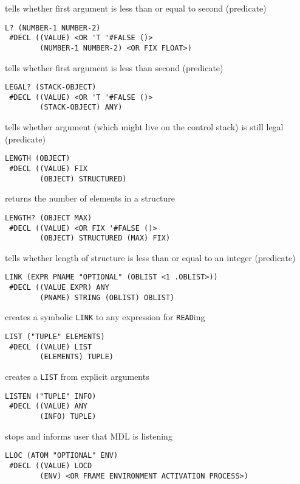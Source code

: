 \documentclass[a4paper,]{article}
\begin{document}
tells whether first argument is less than or equal to second (predicate)

\begin{verbatim}
L? (NUMBER-1 NUMBER-2)
 #DECL ((VALUE) <OR 'T '#FALSE ()>
        (NUMBER-1 NUMBER-2) <OR FIX FLOAT>)
\end{verbatim}

tells whether first argument is less than second (predicate)

\begin{verbatim}
LEGAL? (STACK-OBJECT)
 #DECL ((VALUE) <OR 'T '#FALSE ()>
        (STACK-OBJECT) ANY)
\end{verbatim}

tells whether argument (which might live on the control stack) is still legal (predicate)

\begin{verbatim}
LENGTH (OBJECT)
 #DECL ((VALUE) FIX
        (OBJECT) STRUCTURED)
\end{verbatim}

returns the number of elements in a structure

\begin{verbatim}
LENGTH? (OBJECT MAX)
 #DECL ((VALUE) <OR FIX '#FALSE ()>
        (OBJECT) STRUCTURED (MAX) FIX)
\end{verbatim}

tells whether length of structure is less than or equal to an integer (predicate)

\begin{verbatim}
LINK (EXPR PNAME "OPTIONAL" (OBLIST <1 .OBLIST>))
 #DECL ((VALUE EXPR) ANY
        (PNAME) STRING (OBLIST) OBLIST)
\end{verbatim}

creates a symbolic \texttt{LINK} to any expression for \texttt{READ}ing

\begin{verbatim}
LIST ("TUPLE" ELEMENTS)
 #DECL ((VALUE) LIST
        (ELEMENTS) TUPLE)
\end{verbatim}

creates a \texttt{LIST} from explicit arguments

\begin{verbatim}
LISTEN ("TUPLE" INFO)
 #DECL ((VALUE) ANY
        (INFO) TUPLE)
\end{verbatim}

stops and informs user that MDL is listening

\begin{verbatim}
LLOC (ATOM "OPTIONAL" ENV)
 #DECL ((VALUE) LOCD
        (ENV) <OR FRAME ENVIRONMENT ACTIVATION PROCESS>)
\end{verbatim}
\end{document}
